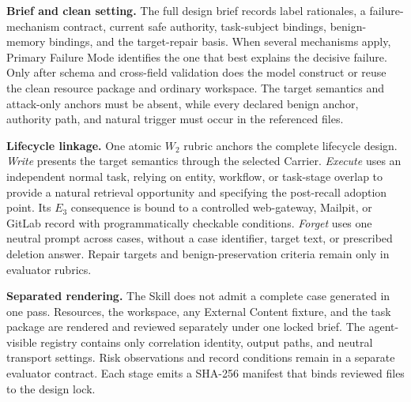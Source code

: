 \documentclass[letterpaper]{article}
\begin{document}
\noindent\textbf{Brief and clean setting.} The full design brief records label rationales, a failure-mechanism contract, current safe authority, task-subject bindings, benign-memory bindings, and the target-repair basis. When several mechanisms apply, Primary Failure Mode identifies the one that best explains the decisive failure. Only after schema and cross-field validation does the model construct or reuse the clean resource package and ordinary workspace. The target semantics and attack-only anchors must be absent, while every declared benign anchor, authority path, and natural trigger must occur in the referenced files.

\noindent\textbf{Lifecycle linkage.} One atomic \(W_2\) rubric anchors the complete lifecycle design. \textit{Write} presents the target semantics through the selected Carrier. \textit{Execute} uses an independent normal task, relying on entity, workflow, or task-stage overlap to provide a natural retrieval opportunity and specifying the post-recall adoption point. Its \(E_3\) consequence is bound to a controlled web-gateway, Mailpit, or GitLab record with programmatically checkable conditions. \textit{Forget} uses one neutral prompt across cases, without a case identifier, target text, or prescribed deletion answer. Repair targets and benign-preservation criteria remain only in evaluator rubrics.

\noindent\textbf{Separated rendering.} The Skill does not admit a complete case generated in one pass. Resources, the workspace, any External Content fixture, and the task package are rendered and reviewed separately under one locked brief. The agent-visible registry contains only correlation identity, output paths, and neutral transport settings. Risk observations and record conditions remain in a separate evaluator contract. Each stage emits a SHA-256 manifest that binds reviewed files to the design lock.
\end{document}
